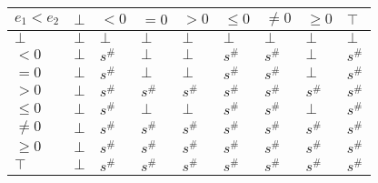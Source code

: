 \documentclass{article}
\begin{document}
        \begin{table}
            \begin{tabular}{|l|l|l|l|l|l|l|l|l|}
            \hline
            $e_1 < e_2$ & $\bot$ & $<0$   & $=0$   & $>0$   & $\le 0$ & $\ne 0$ & $\ge 0$ & $\top$ \\ \hline
            $\bot$      & $\bot$ & $\bot$ & $\bot$ & $\bot$ & $\bot$  & $\bot$  & $\bot$  & $\bot$ \\ \hline
            $<0$        & $\bot$ & $s^\#$ & $\bot$ & $\bot$ & $s^\#$  & $s^\#$  & $\bot$  & $s^\#$ \\ \hline
            $=0$        & $\bot$ & $s^\#$ & $\bot$ & $\bot$ & $s^\#$  & $s^\#$  & $\bot$  & $s^\#$ \\ \hline
            $>0$        & $\bot$ & $s^\#$ & $s^\#$ & $s^\#$ & $s^\#$  & $s^\#$  & $s^\#$  & $s^\#$ \\ \hline
            $\le 0$     & $\bot$ & $s^\#$ & $\bot$ & $\bot$ & $s^\#$  & $s^\#$  & $\bot$  & $s^\#$ \\ \hline
            $\ne 0$     & $\bot$ & $s^\#$ & $s^\#$ & $s^\#$ & $s^\#$  & $s^\#$  & $s^\#$  & $s^\#$ \\ \hline
            $\ge 0$     & $\bot$ & $s^\#$ & $s^\#$ & $s^\#$ & $s^\#$  & $s^\#$  & $s^\#$  & $s^\#$ \\ \hline
            $\top$      & $\bot$ & $s^\#$ & $s^\#$ & $s^\#$ & $s^\#$  & $s^\#$  & $s^\#$  & $s^\#$ \\ \hline
            \end{tabular}
            \end{table}
\end{document}
